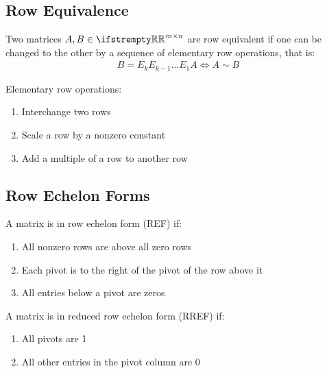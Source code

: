 \documentclass[12pt, a4paper]{article}
\begin{document}
\begin{multicols*}{3}
\subsection{Row Equivalence}
Two matrices $A, B \in \RR^{m{\times}n}$ are row equivalent if one can be changed to the other by a sequence of elementary row operations, that is:
\begin{align*}
  B = E_kE_{k-1}{\ldots}E_1A \iff A \sim B
\end{align*}

Elementary row operations:
\begin{enumerate}[\roman*.]
  \item Interchange two rows
  \item Scale a row by a nonzero constant
  \item Add a multiple of a row to another row
\end{enumerate}

\subsection{Row Echelon Forms}
A matrix is in row echelon form (REF) if:
\begin{enumerate}[\roman*.]
  \item All nonzero rows are above all zero rows
  \item Each pivot is to the right of the pivot of the row above it
  \item All entries below a pivot are zeros
\end{enumerate}

A matrix is in reduced row echelon form (RREF) if:
\begin{enumerate}[\roman*.]
  \item All pivots are 1
  \item All other entries in the pivot column are 0
\end{enumerate}


\end{multicols*}
\end{document}
